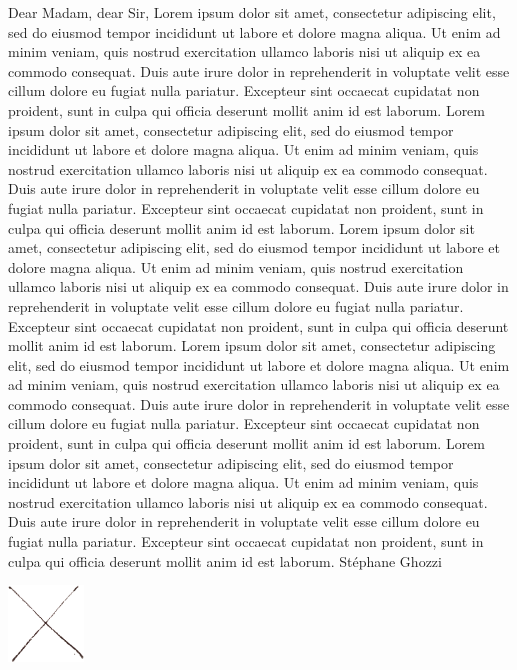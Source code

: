 \documentclass[a4paper,11pt,oneside]{article}
\begin{document}
Dear Madam, dear Sir,
\bigbreak
Lorem ipsum dolor sit amet, consectetur adipiscing elit, sed do eiusmod tempor incididunt ut labore et dolore magna aliqua. Ut enim ad minim veniam, quis nostrud exercitation ullamco laboris nisi ut aliquip ex ea commodo consequat. Duis aute irure dolor in reprehenderit in voluptate velit esse cillum dolore eu fugiat nulla pariatur. Excepteur sint occaecat cupidatat non proident, sunt in culpa qui officia deserunt mollit anim id est laborum.
\bigbreak
Lorem ipsum dolor sit amet, consectetur adipiscing elit, sed do eiusmod tempor incididunt ut labore et dolore magna aliqua. Ut enim ad minim veniam, quis nostrud exercitation ullamco laboris nisi ut aliquip ex ea commodo consequat. Duis aute irure dolor in reprehenderit in voluptate velit esse cillum dolore eu fugiat nulla pariatur. Excepteur sint occaecat cupidatat non proident, sunt in culpa qui officia deserunt mollit anim id est laborum.
\bigbreak
Lorem ipsum dolor sit amet, consectetur adipiscing elit, sed do eiusmod tempor incididunt ut labore et dolore magna aliqua. Ut enim ad minim veniam, quis nostrud exercitation ullamco laboris nisi ut aliquip ex ea commodo consequat. Duis aute irure dolor in reprehenderit in voluptate velit esse cillum dolore eu fugiat nulla pariatur. Excepteur sint occaecat cupidatat non proident, sunt in culpa qui officia deserunt mollit anim id est laborum.
\bigbreak
Lorem ipsum dolor sit amet, consectetur adipiscing elit, sed do eiusmod tempor incididunt ut labore et dolore magna aliqua. Ut enim ad minim veniam, quis nostrud exercitation ullamco laboris nisi ut aliquip ex ea commodo consequat. Duis aute irure dolor in reprehenderit in voluptate velit esse cillum dolore eu fugiat nulla pariatur. Excepteur sint occaecat cupidatat non proident, sunt in culpa qui officia deserunt mollit anim id est laborum.
\bigbreak
Lorem ipsum dolor sit amet, consectetur adipiscing elit, sed do eiusmod tempor incididunt ut labore et dolore magna aliqua. Ut enim ad minim veniam, quis nostrud exercitation ullamco laboris nisi ut aliquip ex ea commodo consequat. Duis aute irure dolor in reprehenderit in voluptate velit esse cillum dolore eu fugiat nulla pariatur. Excepteur sint occaecat cupidatat non proident, sunt in culpa qui officia deserunt mollit anim id est laborum.
\bigbreak
Stéphane Ghozzi

\vspace{1cm}

\includegraphics[width=0.15\textwidth,left]{signature.png}
\end{document}
